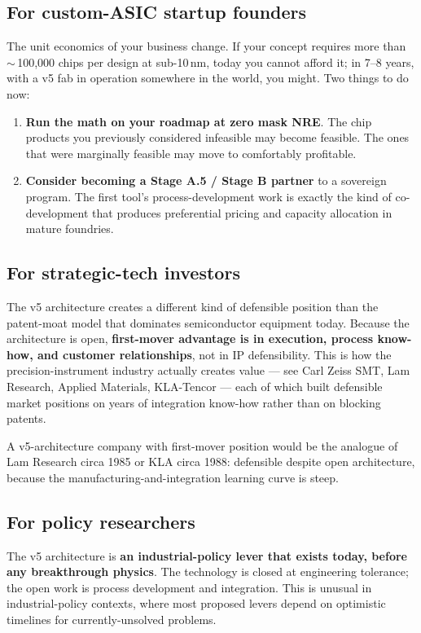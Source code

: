 \documentclass[11pt,letterpaper]{article}
\begin{document}
\subsection{For custom-ASIC startup founders}

The unit economics of your business change. If your concept requires more than $\sim$\,100{,}000 chips per design at sub-10\,nm, today you cannot afford it; in 7--8 years, with a v5 fab in operation somewhere in the world, you might. Two things to do now:

\begin{enumerate}[leftmargin=1.6em]
  \item \textbf{Run the math on your roadmap at zero mask NRE}. The chip products you previously considered infeasible may become feasible. The ones that were marginally feasible may move to comfortably profitable.
  \item \textbf{Consider becoming a Stage A.5 / Stage B partner} to a sovereign program. The first tool's process-development work is exactly the kind of co-development that produces preferential pricing and capacity allocation in mature foundries.
\end{enumerate}

\subsection{For strategic-tech investors}

The v5 architecture creates a different kind of defensible position than the patent-moat model that dominates semiconductor equipment today. Because the architecture is open, \textbf{first-mover advantage is in execution, process know-how, and customer relationships}, not in IP defensibility. This is how the precision-instrument industry actually creates value --- see Carl Zeiss SMT, Lam Research, Applied Materials, KLA-Tencor --- each of which built defensible market positions on years of integration know-how rather than on blocking patents.

A v5-architecture company with first-mover position would be the analogue of Lam Research circa 1985 or KLA circa 1988: defensible despite open architecture, because the manufacturing-and-integration learning curve is steep.

\subsection{For policy researchers}

The v5 architecture is \textbf{an industrial-policy lever that exists today, before any breakthrough physics}. The technology is closed at engineering tolerance; the open work is process development and integration. This is unusual in industrial-policy contexts, where most proposed levers depend on optimistic timelines for currently-unsolved problems.
\end{document}
